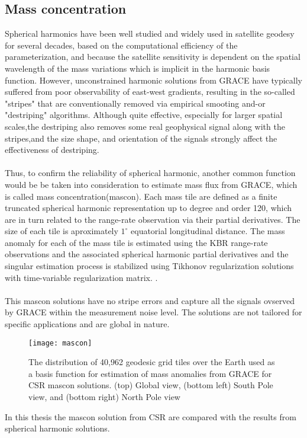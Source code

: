 \subsection{Mass concentration}
Spherical harmonics have been well studied and widely used in satellite geodesy for several decades, based on the computational efficiency of the parameterization, and because the satellite sensitivity is dependent on the spatial wavelength of the mass variations which is implicit in the harmonic basis function. However, unconstrained harmonic solutions from GRACE have typically suffered from poor observability of east-west gradients, resulting in the so-called "stripes" that are conventionally removed via empirical smooting and-or "destriping" algorithms. Although quite effective, especially for larger spatial scales,the destriping also removes some real geophysical signal along with the stripes,and the size shape, and orientation of the signals strongly affect the effectiveness of destriping.\cite{watkins2015improved} \\\\
Thus, to confirm the reliability of spherical harmonic, another common function would be be taken into consideration to estimate mass flux from GRACE, which is called mass concentration(mascon). Each mass tile are defined as a finite truncated spherical harmonic representation up to degree and order 120, which are in turn related to the range-rate observation via their partial derivatives. The size of each tile is aproximately $1^{\circ}$ equatorial longitudinal distance. The mass anomaly for each of the mass tile is estimated using the KBR range-rate observations and the associated spherical harmonic partial derivatives and the singular estimation process is stabilized using Tikhonov regularization solutions with time-variable regularization matrix. \cite{save2016high}. \\\\
This mascon solutions have no stripe errors and capture all the signals ovserved by GRACE within the measurement noise level. The solutions are not tailored for specific applications and are global in nature.\cite{save2016high} 
\begin{figure}[htbp]
	\centering
	\texttt{[image: mascon]} %
	\caption{The distribution of 40,962 geodesic grid tiles over the Earth used as a basis function for estimation of mass
		anomalies from GRACE for CSR mascon solutions. (top) Global view, (bottom left) South Pole view, and (bottom right) North Pole view \cite{save2016high}} 
	\label{fig:mascon}
\end{figure}
In this thesis the mascon solution from CSR are compared with the results from spherical harmonic solutions.
\newpage
